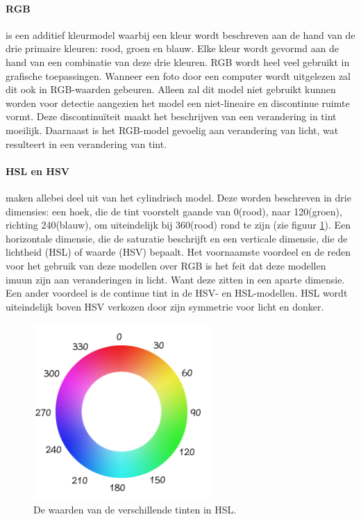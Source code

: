 \paragraph{RGB} is een additief kleurmodel waarbij een kleur wordt beschreven aan de hand van de drie primaire kleuren: rood, groen en blauw. Elke kleur wordt gevormd aan de hand van een combinatie van deze drie kleuren. RGB wordt heel veel gebruikt in grafische toepassingen. Wanneer een foto door een computer wordt uitgelezen zal dit ook in RGB-waarden gebeuren. Alleen zal dit model niet gebruikt kunnen worden voor detectie aangezien het model een niet-lineaire en discontinue ruimte vormt. Deze discontinuïteit maakt het beschrijven van een verandering in tint moeilijk. Daarnaast is het RGB-model gevoelig aan verandering van licht, wat resulteert in een verandering van tint.

\paragraph{HSL en HSV} maken allebei deel uit van het cylindrisch model. Deze worden beschreven in drie dimensies: een hoek, die de tint voorstelt gaande van 0\degree (rood), naar 120\degree (groen), richting 240\degree (blauw), om uiteindelijk bij 360\degree (rood) rond te zijn (zie figuur \ref{colorWheel}). Een horizontale dimensie, die de saturatie beschrijft en een verticale dimensie, die de lichtheid (HSL) of waarde (HSV) bepaalt. Het voornaamste voordeel en de reden voor het gebruik van deze modellen over RGB is het feit dat deze modellen imuun zijn aan veranderingen in licht. Want deze zitten in een aparte dimensie. Een ander voordeel is de continue tint in de HSV- en HSL-modellen. HSL wordt uiteindelijk boven HSV verkozen door zijn symmetrie voor licht en donker. \cite{inbook} \cite{rasouli2017effect}

\begin{figure}[h]
	\center
	\includegraphics[width=0.6\textwidth]{img/hslColorWheel.png}
	\caption{De waarden van de verschillende tinten in HSL. \cite{hslColorWheel}}
	\label{colorWheel}
\end{figure}